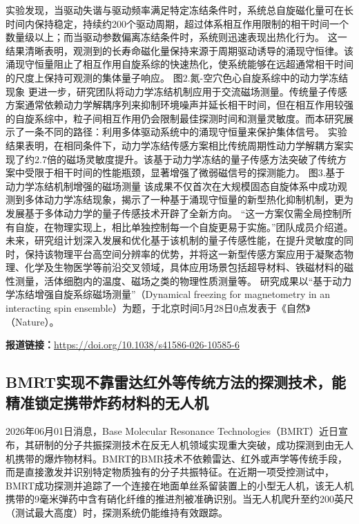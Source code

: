 \documentclass[12pt,a4paper]{ctexart}
\begin{document}
实验发现，当驱动失谐与驱动频率满足特定冻结条件时，系统总自旋磁化量可在长时间内保持稳定，持续约200个驱动周期，超过体系相互作用限制的相干时间一个数量级以上；而当驱动参数偏离冻结条件时，系统则迅速表现出热化行为。
这一结果清晰表明，观测到的长寿命磁化量保持来源于周期驱动诱导的涌现守恒律。该涌现守恒量阻止了相互作用自旋系综的快速热化，使系统能够在远超通常相干时间的尺度上保持可观测的集体量子响应。
图2.氮-空穴色心自旋系综中的动力学冻结现象
更进一步，研究团队将动力学冻结机制应用于交流磁场测量。传统量子传感方案通常依赖动力学解耦序列来抑制环境噪声并延长相干时间，但在相互作用较强的自旋系综中，粒子间相互作用仍会限制最佳探测时间和测量灵敏度。而本研究展示了一条不同的路径：利用多体驱动系统中的涌现守恒量来保护集体信号。
实验结果表明，在相同条件下，动力学冻结传感方案相比传统周期性动力学解耦方案实现了约2.7倍的磁场灵敏度提升。该基于动力学冻结的量子传感方法突破了传统方案中受限于相干时间的性能瓶颈，显著增强了微弱磁信号的探测能力。
图3.基于动力学冻结机制增强的磁场测量
该成果不仅首次在大规模固态自旋体系中成功观测到多体动力学冻结现象，揭示了一种基于涌现守恒量的新型热化抑制机制，更为发展基于多体动力学的量子传感技术开辟了全新方向。
“这一方案仅需全局控制所有自旋，在物理实现上，相比单独控制每一个自旋更易于实施。”团队成员介绍道。未来，研究组计划深入发展和优化基于该机制的量子传感性能，在提升灵敏度的同时，保持该物理平台高空间分辨率的优势，并将这一新型传感方案应用于凝聚态物理、化学及生物医学等前沿交叉领域，具体应用场景包括超导材料、铁磁材料的磁性测量，活体细胞内的温度、磁场之类的物理性质测量等。
研究成果以“基于动力学冻结增强自旋系综磁场测量”（Dynamical freezing for magnetometry in an interacting spin ensemble）为题，于北京时间5月28日0点发表于《自然》（Nature）。

\noindent\textbf{报道链接：}\url{https://doi.org/10.1038/s41586-026-10585-6}

\subsection{ BMRT实现不靠雷达红外等传统方法的探测技术，能精准锁定携带炸药材料的无人机 }

2026年06月01日消息，Base Molecular Resonance Technologies（BMRT）近日宣布，其研制的分子共振探测技术在反无人机领域实现重大突破，成功探测到由无人机携带的爆炸物材料。BMRT的BMR技术不依赖雷达、红外或声学等传统手段，而是直接激发并识别特定物质独有的分子共振特征。在近期一项受控测试中，BMRT成功探测并追踪了一个连接在地面单丝系留装置上的小型无人机，该无人机携带的9毫米弹药中含有硝化纤维的推进剂被准确识别。当无人机爬升至约200英尺（测试最大高度）时，探测系统仍能维持有效跟踪。
\end{document}
